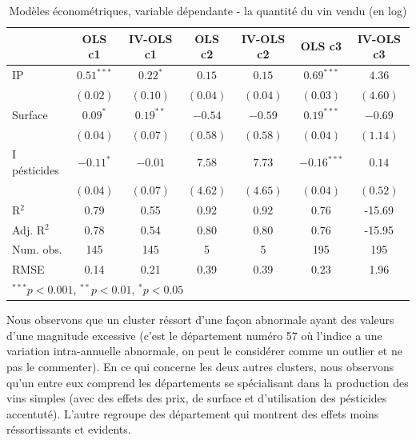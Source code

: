 \documentclass[11pt,]{article}
\begin{document}
\FloatBarrier

\begin{table}[!htbp]
\begin{center}
\begin{tabular}{l c c c c c c }
\hline
 & OLS c1 & IV-OLS c1 & OLS c2 & IV-OLS c2 & OLS c3 & IV-OLS c3 \\
\hline
IP           & $0.51^{***}$ & $0.22^{*}$  & $0.15$   & $0.15$   & $0.69^{***}$  & $4.36$   \\
             & $(0.02)$     & $(0.10)$    & $(0.04)$ & $(0.04)$ & $(0.03)$      & $(4.60)$ \\
Surface      & $0.09^{*}$   & $0.19^{**}$ & $-0.54$  & $-0.59$  & $0.19^{***}$  & $-0.69$  \\
             & $(0.04)$     & $(0.07)$    & $(0.58)$ & $(0.58)$ & $(0.04)$      & $(1.14)$ \\
I pésticides & $-0.11^{*}$  & $-0.01$     & $7.58$   & $7.73$   & $-0.16^{***}$ & $0.14$   \\
             & $(0.04)$     & $(0.07)$    & $(4.62)$ & $(4.65)$ & $(0.04)$      & $(0.52)$ \\
\hline
R$^2$        & 0.79         & 0.55        & 0.92     & 0.92     & 0.76          & -15.69   \\
Adj. R$^2$   & 0.78         & 0.54        & 0.80     & 0.80     & 0.76          & -15.95   \\
Num. obs.    & 145          & 145         & 5        & 5        & 195           & 195      \\
RMSE         & 0.14         & 0.21        & 0.39     & 0.39     & 0.23          & 1.96     \\
\hline
\multicolumn{7}{l}{\scriptsize{$^{***}p<0.001$, $^{**}p<0.01$, $^*p<0.05$}}
\end{tabular}
\caption{Modèles économétriques, variable dépendante - la quantité du vin vendu (en log)}
\label{table : ols et ivols clusters}
\end{center}
\end{table}

\FloatBarrier

Nous observons que un cluster réssort d'une façon abnormale ayant des
valeurs d'une magnitude excessive (c'est le département numéro 57 où
l'indice a une variation intra-annuelle abnormale, on peut le considérer
comme un outlier et ne pas le commenter). En ce qui concerne les deux
autres clusters, nous observons qu'un entre eux comprend les
départements se spécialisant dans la production des vins simples (avec
des effets des prix, de surface et d'utilisation des pésticides
accentuté). L'autre regroupe des département qui montrent des effets
moins réssortissants et evidents.
\end{document}
